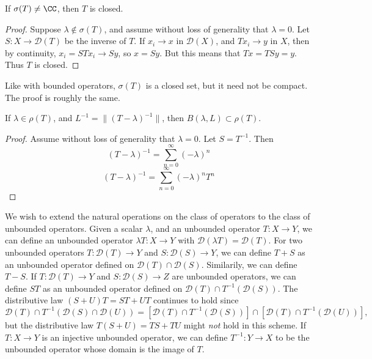 \begin{lemma}
    If $\sigma(T) \neq \CC$, then $T$ is closed.
\end{lemma}
\begin{proof}
    Suppose $\lambda \not \in \sigma(T)$, and assume without loss of generality that $\lambda = 0$. Let $S: X \to \mathcal{D}(T)$ be the inverse of $T$. If $x_i \to x$ in $\mathcal{D}(X)$, and $T x_i \to y$ in $X$, then by continuity, $x_i = STx_i \to Sy$, so $x = Sy$. But this means that $Tx = TSy = y$. Thus $T$ is closed.
\end{proof}

Like with bounded operators, $\sigma(T)$ is a closed set, but it need not be compact. The proof is roughly the same.

\begin{lemma}
    If $\lambda \in \rho(T)$, and $L^{-1} = \| (T - \lambda)^{-1} \|$, then $B(\lambda,L) \subset \rho(T)$.
\end{lemma}
\begin{proof}
    Assume without loss of generality that $\lambda = 0$. Let $S = T^{-1}$. Then
    \[ (T - \lambda)^{-1} = \sum_{n = 0}^\infty (-\lambda)^n  \]
    \[ (T - \lambda)^{-1} = \sum_{n = 0}^\infty (-\lambda)^n T^n \]

\end{proof}

We wish to extend the natural operations on the class of operators to the class of unbounded operators. Given a scalar $\lambda$, and an unbounded operator $T: X \to Y$, we can define an unbounded operator $\lambda T: X \to Y$ with $\mathcal{D}(\lambda T) = \mathcal{D}(T)$. For two unbounded operators $T: \mathcal{D}(T) \to Y$ and $S: \mathcal{D}(S) \to Y$, we can define $T + S$ as an unbounded operator defined on $\mathcal{D}(T) \cap \mathcal{D}(S)$. Similarily, we can define $T - S$. If $T: \mathcal{D}(T) \to Y$ and $S: \mathcal{D}(S) \to Z$ are unbounded operators, we can define $ST$ as an unbounded operator defined on $\mathcal{D}(T) \cap T^{-1}(\mathcal{D}(S))$. The distributive law $(S + U)T = ST + UT$ continues to hold since
%
\[ \mathcal{D}(T) \cap T^{-1}(\mathcal{D}(S) \cap \mathcal{D}(U)) = \left[ \mathcal{D}(T) \cap T^{-1}(\mathcal{D}(S)) \right] \cap \left[ \mathcal{D}(T) \cap T^{-1}(\mathcal{D}(U)) \right], \]
%
but the distributive law $T(S + U) = TS + TU$ might \emph{not} hold in this scheme. If $T: X \to Y$ is an injective unbounded operator, we can define $T^{-1}: Y \to X$ to be the unbounded operator whose domain is the image of $T$.



